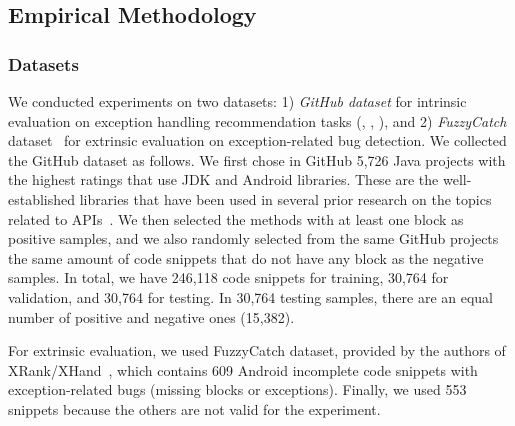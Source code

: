 \vspace{-6pt}
\subsection{Empirical Methodology}

\subsubsection{Datasets}


We conducted experiments on two datasets: 1) {\em GitHub dataset}
for intrinsic evaluation on exception handling recommendation tasks
({\xblock}, {\xstate}, {\xtype}), and 2) {\em FuzzyCatch}
dataset~\cite{xrank-fse20} for extrinsic evaluation on
exception-related bug detection.
%
%
We collected the GitHub dataset as follows. We first chose in GitHub
5,726 Java projects with the highest ratings that use
JDK and Android libraries.
These are the well-established libraries that have been used in
several prior research on the topics related to
APIs~\cite{icse18,liveapi14}.
%
We then selected the methods with at least one  block
as positive samples, and we also randomly selected from the same
GitHub projects the same amount of code snippets that do not have any
 block as the negative samples. In total, we have 246,118
code snippets for training, 30,764 for validation, and 30,764 for
testing. In 30,764 testing samples, there are an equal number of
positive and negative ones (15,382).




For extrinsic evaluation, we used FuzzyCatch dataset, provided by the
authors of XRank/XHand~\cite{xrank-fse20}, which contains 609 Android
incomplete code snippets with exception-related bugs (missing
 blocks or exceptions). Finally, we used 553 snippets
because the others are not valid for the experiment.

